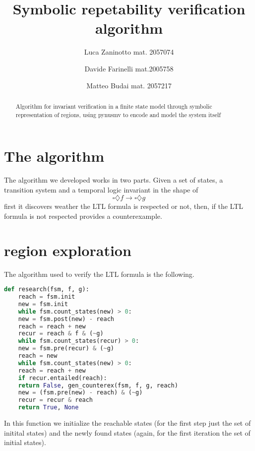 \documentclass[9pt,oneside]{amsart}
\title{Symbolic repetability verification algorithm}
\author{
  Luca Zaninotto mat. 2057074 
  \and
  Davide Farinelli mat.2005758
  \and
  Matteo Budai mat. 2057217
}
\begin{document}
\begin{abstract}
  Algorithm for invariant verification in a finite state model through
  symbolic representation of regions, using pynusmv to encode and
  model the system itself
\end{abstract}
\maketitle
\setlength{\columnsep}{20pt}
\begin{multicols}{2}
  \section{The algorithm}\label{algo}
  The algorithm we developed works in two parts. Given a set of
  states, a transition system and a temporal logic invariant in the
  shape of
  \[
    \square \diamondsuit f \rightarrow \square \diamondsuit g
  \]
  first it discovers weather the LTL formula is respected or not, then,
  if the LTL formula is not respected provides a counterexample.
  \section{region exploration}\label{explore}
  The algorithm used to verify the LTL formula is the following.
  \begin{lstlisting}[language=Python]
  	def research(fsm, f, g):
  	reach = fsm.init
  	new = fsm.init
  	while fsm.count_states(new) > 0:
  	new = fsm.post(new) - reach
  	reach = reach + new
  	recur = reach & f & (~g)
  	while fsm.count_states(recur) > 0:
  	new = fsm.pre(recur) & (~g)
  	reach = new
  	while fsm.count_states(new) > 0:
  	reach = reach + new
  	if recur.entailed(reach):
  	return False, gen_counterex(fsm, f, g, reach)
  	new = (fsm.pre(new) - reach) & (~g)
  	recur = recur & reach
  	return True, None
  \end{lstlisting}\label{code:reachable}
	In this function we initialize the reachable states (for the first step just the
	set of initital states) and the newly found states (again,
	for the first iteration the set of initial states).


\end{multicols}
\end{document}
